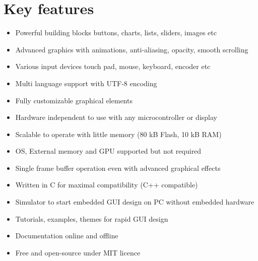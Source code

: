 \documentclass[letterpaper,10pt,english]{sphinxmanual}
\begin{document}
\section{Key features}
\label{\detokenize{intro:key-features}}\begin{itemize}
\item {} 
Powerful building blocks buttons, charts, lists, sliders, images etc

\item {} 
Advanced graphics with animations, anti-aliasing, opacity, smooth scrolling

\item {} 
Various input devices touch pad, mouse, keyboard, encoder etc

\item {} 
Multi language support with UTF-8 encoding

\item {} 
Fully customizable graphical elements

\item {} 
Hardware independent to use with any microcontroller or display

\item {} 
Scalable to operate with little memory (80 kB Flash, 10 kB RAM)

\item {} 
OS, External memory and GPU supported but not required

\item {} 
Single frame buffer operation even with advanced graphical effects

\item {} 
Written in C for maximal compatibility (C++ compatible)

\item {} 
Simulator to start embedded GUI design on PC without embedded hardware

\item {} 
Tutorials, examples, themes for rapid GUI design

\item {} 
Documentation online and offline

\item {} 
Free and open-source under MIT licence

\end{itemize}
\end{document}
